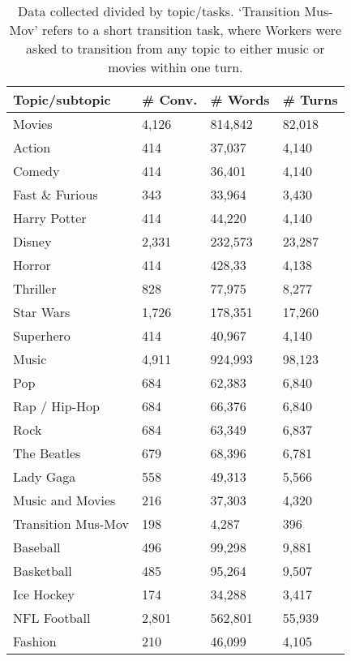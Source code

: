 \documentclass[11pt,a4paper]{article}
\begin{document}


\begin{table}[htbp]
\begin{center}
  \begin{small}
  \begin{tabular}{|l|lll|}
    \hline
    \bf Topic/subtopic & \bf \# Conv. & \bf \# Words & \bf \# Turns \\
    \hline
    Movies & 4,126 & 814,842 & 82,018 \\
    Action & 414 & 37,037 & 4,140 \\
    Comedy & 414 & 36,401 & 4,140 \\
    Fast \& Furious & 343 & 33,964 & 3,430 \\
    Harry Potter & 414 & 44,220 & 4,140 \\
    Disney & 2,331 & 232,573 & 23,287 \\
    Horror & 414 & 428,33 & 4,138 \\
    Thriller & 828 & 77,975 & 8,277\\
    Star Wars & 1,726 & 178,351 & 17,260 \\
    Superhero & 414 & 40,967 & 4,140 \\\hline
    Music & 4,911 & 924,993 & 98,123 \\
    Pop & 684 & 62,383 & 6,840\\
    Rap / Hip-Hop & 684 & 66,376 & 6,840\\
    Rock & 684 & 63,349 & 6,837\\
    The Beatles & 679 &  68,396 & 6,781 \\
    Lady Gaga & 558 & 49,313 & 5,566\\\hline
    Music and Movies & 216 & 37,303 & 4,320 \\\hline
    Transition Mus-Mov & 198 & 4,287 & 396 \\\hline
    Baseball & 496 &  99,298 & 9,881 \\
    Basketball  & 485 & 95,264 & 9,507\\
    Ice Hockey  & 174 & 34,288  & 3,417 \\
    NFL Football & 2,801 &  562,801 & 55,939\\\hline
    Fashion & 210 & 46,099 & 4,105 \\
    \hline
  \end{tabular}
  \end{small}
  \smallskip
    \caption{Data collected divided by topic/tasks. `Transition Mus-Mov' refers to a short transition task, where Workers were asked to transition from any topic to either music or movies within one turn.}
    \label{tab:data}
\end{center}
\end{table}
\end{document}
